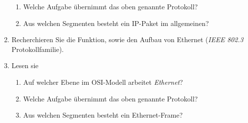 \documentclass[paper=a4,fontsize=11pt]{scrartcl}%
\numberwithin{equation}{section}
\begin{document}
\begin{enumerate}
\begin{enumerate}
		\item Welche Aufgabe übernimmt das oben genannte Protokoll?
		\item Aus welchen Segmenten besteht ein IP-Paket im allgemeinen?
	\end{enumerate}
	\item Recherchieren Sie die Funktion, sowie den Aufbau von Ethernet (\emph{IEEE 802.3} Protokollfamilie).
	\item Lesen sie \cite[Kap. 5ff]{Kurose2012}
	\begin{enumerate}
		\item Auf welcher Ebene im OSI-Modell arbeitet \emph{Ethernet}?
		\item Welche Aufgabe übernimmt das oben genannte Protokoll?
		\item Aus welchen Segmenten besteht ein Ethernet-Frame?
	\end{enumerate}
\end{enumerate}
\end{document}
